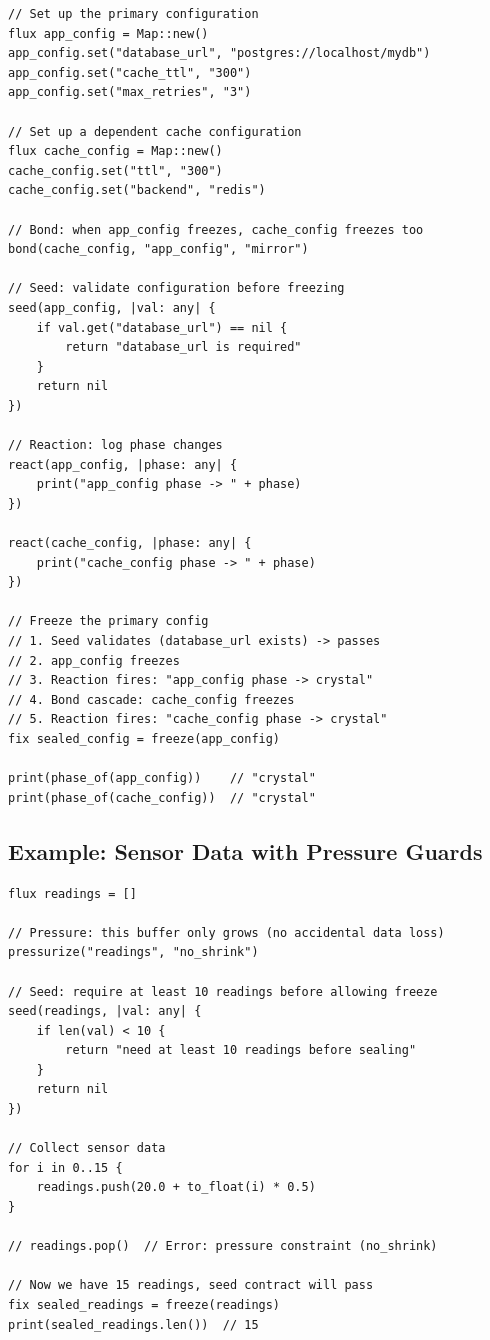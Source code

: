\begin{lstlisting}[language=Lattice, caption={A reactive configuration pipeline}]
// Set up the primary configuration
flux app_config = Map::new()
app_config.set("database_url", "postgres://localhost/mydb")
app_config.set("cache_ttl", "300")
app_config.set("max_retries", "3")

// Set up a dependent cache configuration
flux cache_config = Map::new()
cache_config.set("ttl", "300")
cache_config.set("backend", "redis")

// Bond: when app_config freezes, cache_config freezes too
bond(cache_config, "app_config", "mirror")

// Seed: validate configuration before freezing
seed(app_config, |val: any| {
    if val.get("database_url") == nil {
        return "database_url is required"
    }
    return nil
})

// Reaction: log phase changes
react(app_config, |phase: any| {
    print("app_config phase -> " + phase)
})

react(cache_config, |phase: any| {
    print("cache_config phase -> " + phase)
})

// Freeze the primary config
// 1. Seed validates (database_url exists) -> passes
// 2. app_config freezes
// 3. Reaction fires: "app_config phase -> crystal"
// 4. Bond cascade: cache_config freezes
// 5. Reaction fires: "cache_config phase -> crystal"
fix sealed_config = freeze(app_config)

print(phase_of(app_config))    // "crystal"
print(phase_of(cache_config))  // "crystal"
\end{lstlisting}

\subsection{Example: Sensor Data with Pressure Guards}

\begin{lstlisting}[language=Lattice, caption={Sensor data with pressure and seeds}]
flux readings = []

// Pressure: this buffer only grows (no accidental data loss)
pressurize("readings", "no_shrink")

// Seed: require at least 10 readings before allowing freeze
seed(readings, |val: any| {
    if len(val) < 10 {
        return "need at least 10 readings before sealing"
    }
    return nil
})

// Collect sensor data
for i in 0..15 {
    readings.push(20.0 + to_float(i) * 0.5)
}

// readings.pop()  // Error: pressure constraint (no_shrink)

// Now we have 15 readings, seed contract will pass
fix sealed_readings = freeze(readings)
print(sealed_readings.len())  // 15
\end{lstlisting}


